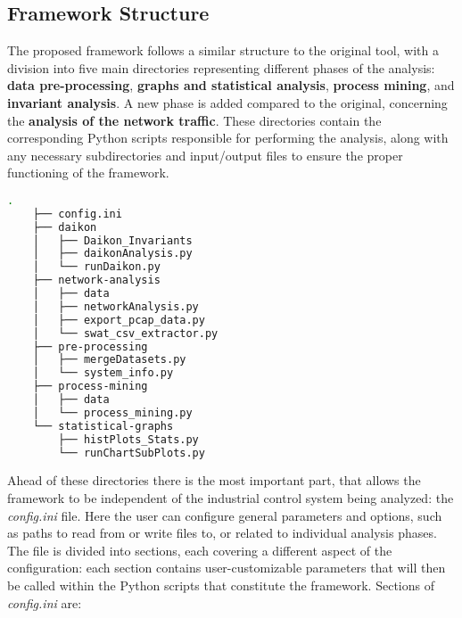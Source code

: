 \subsection{Framework Structure}
\label{subsec:4_framework_struct}
The proposed framework follows a similar structure to the original tool, with a division into five main directories representing different phases of the analysis: \textbf{data pre-processing}, \textbf{graphs and statistical analysis}, \textbf{process mining}, and \textbf{invariant analysis}. A new phase is added compared to the original, concerning the \textbf{analysis of the network traffic}. These directories contain the corresponding Python scripts responsible for performing the analysis, along with any necessary subdirectories and input/output files to ensure the proper functioning of the framework.

\begin{lstlisting}[language=bash, numbers=none, caption=Novel Framework structure and Python scripts, label=lst:4_tree_command]
	.
	├── config.ini
	├── daikon
	│   ├── Daikon_Invariants
	│   ├── daikonAnalysis.py
	│   └── runDaikon.py
	├── network-analysis
	│   ├── data
	│   ├── networkAnalysis.py
	│   ├── export_pcap_data.py
	│   └── swat_csv_extractor.py
	├── pre-processing
	│   ├── mergeDatasets.py
	│   └── system_info.py
	├── process-mining
	│   ├── data
	│   └── process_mining.py
	└── statistical-graphs
	    ├── histPlots_Stats.py
	    └── runChartSubPlots.py
\end{lstlisting}

Ahead of these directories there is the most important part, that allows the framework to be independent of the industrial control system being analyzed: the \textit{config.ini} file. Here the user can configure general parameters and options, such as paths to read from or write files to, or related to individual analysis phases.\newline
The file is divided into sections, each covering a different aspect of 
the configuration: each section contains user-customizable parameters 
that will then be called within the Python scripts that constitute the framework. Sections of \textit{config.ini} are:

